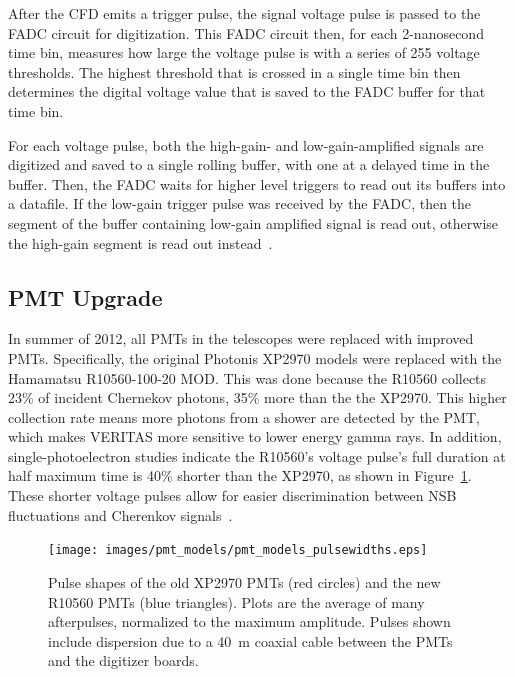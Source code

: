 After the CFD emits a trigger pulse, the signal voltage pulse is passed to the FADC circuit for digitization.
This FADC circuit then, for each 2-nanosecond time bin, measures how large the voltage pulse is with a series of 255 voltage thresholds.
The highest threshold that is crossed in a single time bin then determines the digital voltage value that is saved to the FADC buffer for that time bin.

For each voltage pulse, both the high-gain- and low-gain-amplified signals are digitized and saved to a single rolling buffer, with one at a delayed time in the buffer.
Then, the FADC waits for higher level triggers to read out its buffers into a datafile.
If the low-gain trigger pulse was received by the FADC, then the segment of the buffer containing low-gain amplified signal is read out, otherwise the high-gain segment is read out instead~\cite{Veritas_Detector,veritas_FADC}.

\subsection{PMT Upgrade}
In summer of 2012, all PMTs in the telescopes were replaced with improved PMTs.
Specifically, the original Photonis XP2970 models were replaced with the Hamamatsu R10560-100-20 MOD.
This was done because the R10560 collects 23\% of incident Chernekov photons, 35\% more than the the XP2970.
This higher collection rate means more photons from a shower are detected by the PMT, which makes VERITAS more sensitive to lower energy gamma rays.
In addition, single-photoelectron studies indicate the R10560's voltage pulse's full duration at half maximum time is \nicetilde{}40\% shorter than the XP2970, as shown in Figure~\ref{fig:pmt_pulse_widths}.
These shorter voltage pulses allow for easier discrimination between NSB fluctuations and Cherenkov signals~\cite{pmtmodels}.

\begin{figure}[ht]
  \centering
  \texttt{[image: images/pmt\_models/pmt\_models\_pulsewidths.eps]}
  \caption[Pulse Shapes]{
    Pulse shapes of the old XP2970 PMTs (red circles) and the new R10560 PMTs (blue triangles).
    Plots are the average of many afterpulses, normalized to the maximum amplitude.
    Pulses shown include dispersion due to a \nicetilde{}\SI{40}{m} coaxial cable between the PMTs and the digitizer boards.~\cite{pmtmodels}}
  \label{fig:pmt_pulse_widths}
\end{figure}

